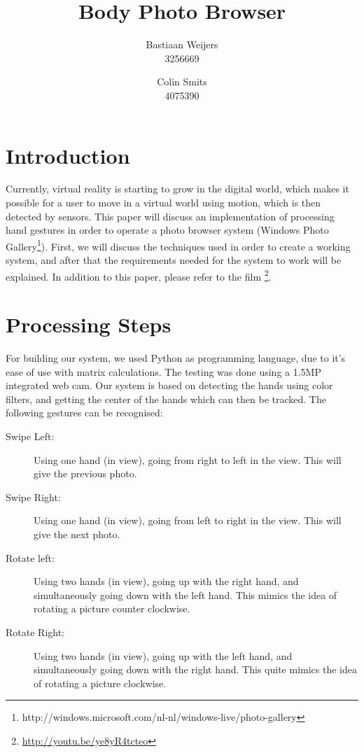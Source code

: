 \documentclass[11pt,a4paper]{article}
\author{Bastiaan Weijers \\ 3256669 \and Colin Smits \\4075390}
\title{Body Photo Browser}
\begin{document}
\maketitle


\section{Introduction}
Currently, virtual reality is starting to grow in the digital world, which makes it possible for a user to move in a virtual world using motion, which is then detected by sensors. This paper will discuss an implementation of processing hand gestures in order to operate a photo browser system (Windows Photo Gallery\footnote{http://windows.microsoft.com/nl-nl/windows-live/photo-gallery}). First, we will discuss the techniques used in order to create a working system, and after that the requirements needed for the system to work will be explained. In addition to this paper, please refer to the film \footnote{\url{http://youtu.be/ye8yR4tcteo}}.

\section{Processing Steps}
For building our system, we used Python as programming language, due to it's ease of use with matrix calculations. The testing was done using a 1.5MP integrated web cam. Our system is based on detecting the hands using color filters, and getting the center of the hands which can then be tracked. The following gestures can be recognised:

\begin{description}
\item[Swipe Left:] Using one hand (in view), going from right to left in the view. This will give the previous photo.
\item[Swipe Right:] Using one hand (in view), going from left to right in the view. This will give the next photo.
\item[Rotate left:] Using two hands (in view), going up with the right hand, and simultaneously going down with the left hand. This mimics the idea of rotating a picture counter clockwise.
\item[Rotate Right:] Using two hands (in view), going up with the left hand, and simultaneously going down with the right hand. This quite mimics the idea of rotating a picture clockwise.
\end{description}
\end{document}
